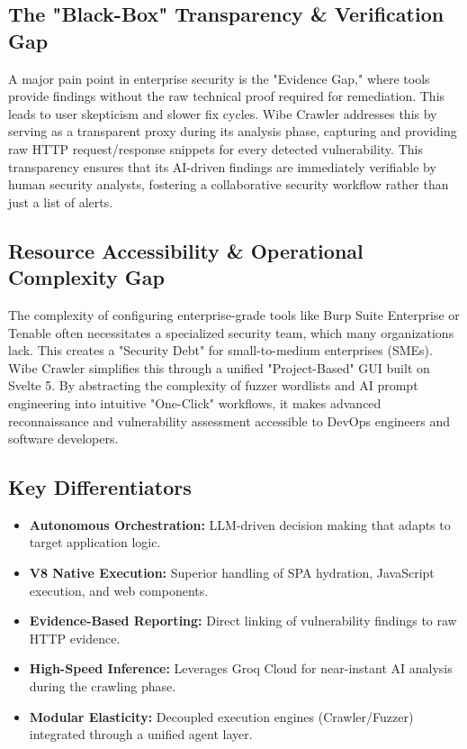 \documentclass[12pt,oneside,a4paper]{book}
\begin{document}
\subsection{The "Black-Box" Transparency \& Verification Gap}
A major pain point in enterprise security is the "Evidence Gap," where tools provide findings without the raw technical proof required for remediation. This leads to user skepticism and slower fix cycles. Wibe Crawler addresses this by serving as a transparent proxy during its analysis phase, capturing and providing raw HTTP request/response snippets for every detected vulnerability. This transparency ensures that its AI-driven findings are immediately verifiable by human security analysts, fostering a collaborative security workflow rather than just a list of alerts.

\subsection{Resource Accessibility \& Operational Complexity Gap}
The complexity of configuring enterprise-grade tools like Burp Suite Enterprise or Tenable often necessitates a specialized security team, which many organizations lack. This creates a "Security Debt" for small-to-medium enterprises (SMEs). Wibe Crawler simplifies this through a unified "Project-Based" GUI built on Svelte 5. By abstracting the complexity of fuzzer wordlists and AI prompt engineering into intuitive "One-Click" workflows, it makes advanced reconnaissance and vulnerability assessment accessible to DevOps engineers and software developers.

\subsection{Key Differentiators}

\begin{itemize}
  \item \textbf{Autonomous Orchestration:} LLM-driven decision making that adapts to target application logic.
  \item \textbf{V8 Native Execution:} Superior handling of SPA hydration, JavaScript execution, and web components.
  \item \textbf{Evidence-Based Reporting:} Direct linking of vulnerability findings to raw HTTP evidence.
  \item \textbf{High-Speed Inference:} Leverages Groq Cloud for near-instant AI analysis during the crawling phase.
  \item \textbf{Modular Elasticity:} Decoupled execution engines (Crawler/Fuzzer) integrated through a unified agent layer.
\end{itemize}
\end{document}
